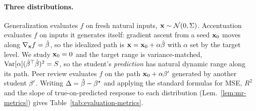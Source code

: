 \paragraph{Three distributions.}
Generalization evaluates $f$ on fresh natural inputs, $\mathbf{x}\sim\mathcal N(0,\Sigma)$. Accentuation evaluates $f$ on inputs it generates itself: gradient ascent from a seed $\mathbf{x}_0$ moves along $\nabla_{\mathbf{x}} f=\hat{\beta}$, so the idealized path is $\mathbf{x}=\mathbf{x}_0+\alpha\hat{\beta}$ with $\alpha$ set by the target level\footnotemark. %
We study $\mathbf{x}_0=0$ and the target range is variance-matched, $\mathrm{Var}[\alpha]({\hat{\beta}}^\top\hat{\beta})^2=S$, so the student's \emph{prediction} has natural dynamic range along its path. Peer review evaluates $f$ on the path $\mathbf{x}_0+\alpha{\beta^{\prime}}$ generated by another student ${\beta^{\prime}}$. Writing $\Delta=\hat{\beta}-{\beta^{\star}}$ and applying the standard formulas for MSE, $R^2$ and the slope of true-on-predicted response to each distribution (Lem.~\ref{lem:mr-metrics}) gives Table~\ref{tab:evaluation-metrics}.

